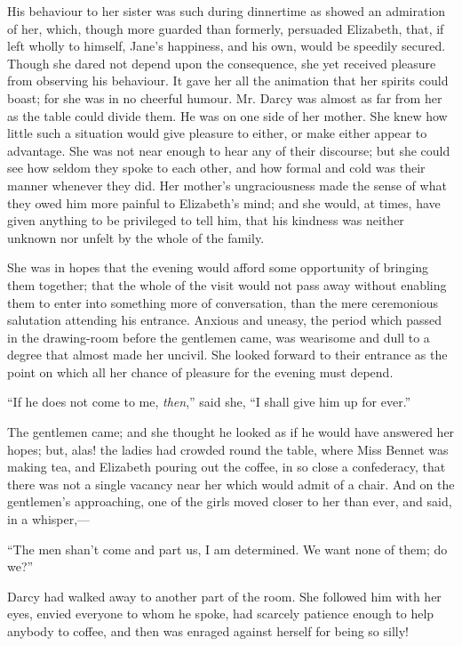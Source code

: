 \documentclass[12pt,openright]{book}
\begin{document}
His behaviour to her sister was such during dinnertime as showed an admiration of her, which, though more guarded than formerly, persuaded Elizabeth, that, if left wholly to himself, Jane’s happiness, and his own, would be speedily secured. Though she dared not depend upon the consequence, she yet received pleasure from observing his behaviour. It gave her all the animation that her spirits could boast; for she was in no cheerful humour. Mr. Darcy was almost as far from her as the table could divide them. He was on one side of her mother. She knew how little such a situation would give pleasure to either, or make either appear to advantage. She was not near enough to hear any of their discourse; but she could see how seldom they spoke to each other, and how formal and cold was their manner whenever they did. Her mother’s ungraciousness made the sense of what they owed him more painful to Elizabeth’s mind; and she would, at times, have given anything to be privileged to tell him, that his kindness was neither unknown nor unfelt by the whole of the family.

She was in hopes that the evening would afford some opportunity of bringing them together; that the whole of the visit would not pass away without enabling them to enter into something more of conversation, than the mere ceremonious salutation attending his entrance. Anxious and uneasy, the period which passed in the drawing-room before the gentlemen came, was wearisome and dull to a degree that almost made her uncivil. She looked forward to their entrance as the point on which all her chance of pleasure for the evening must depend.

“If he does not come to me, \textit{then},” said she, “I shall give him up for ever.”

The gentlemen came; and she thought he looked as if he would have answered her hopes; but, alas! the ladies had crowded round the table, where Miss Bennet was making tea, and Elizabeth pouring out the coffee, in so close a confederacy, that there was not a single vacancy near her which would admit of a chair. And on the gentlemen’s approaching, one of the girls moved closer to her than ever, and said, in a whisper,—

“The men shan’t come and part us, I am determined. We want none of them; do we?”

Darcy had walked away to another part of the room. She followed him with her eyes, envied everyone to whom he spoke, had scarcely patience enough to help anybody to coffee, and then was enraged against herself for being so silly!
\end{document}
